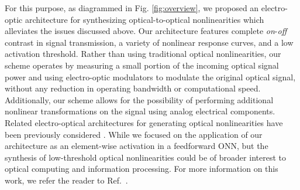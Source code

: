 For this purpose,  as diagrammed in Fig. \ref{fig:overview}, we proposed an electro-optic architecture for synthesizing optical-to-optical nonlinearities which alleviates the issues discussed above.
Our architecture features complete \textit{on}-\textit{off} contrast in signal transmission, a variety of nonlinear response curves, and a low activation threshold. 
Rather than using traditional optical nonlinearities, our scheme operates by measuring a small portion of the incoming optical signal power and using electro-optic modulators to modulate the original optical signal, without any reduction in operating bandwidth or computational speed. 
Additionally, our scheme allows for the possibility of performing additional nonlinear transformations on the signal using analog electrical components. 
Related electro-optical architectures for generating optical nonlinearities have been previously considered \cite{lentine_evolution_1993, majumdar_cavityenabled_2014, tait_silicon_2018}. 
While we focused on the application of our architecture as an element-wise activation in a feedforward ONN, but the synthesis of low-threshold optical nonlinearities could be of broader interest to optical computing and information processing.  For more information on this work, we refer the reader to Ref.~.

